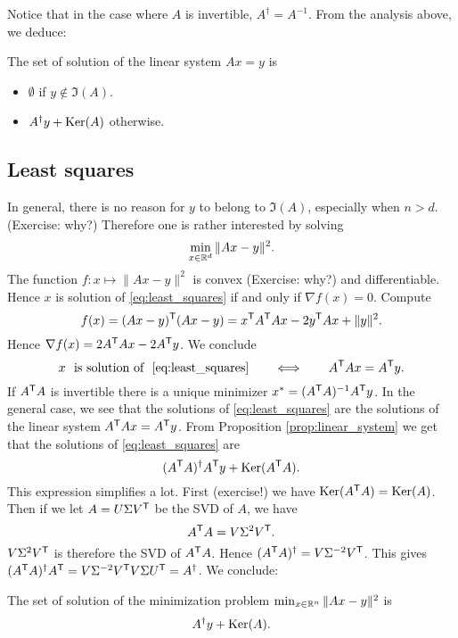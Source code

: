 \documentclass[11pt,nocut]{article}
\begin{document}
Notice that in the case where $A$ is invertible, $A^{\dagger} = A^{-1}$.
From the analysis above, we deduce:
\begin{proposition}\label{prop:linear_system}
	The set of solution of the linear system $Ax = y$ is
	\begin{itemize}
		\item $\emptyset$ if $y \not\in \Im(A)$.
		\item $A^{\dagger}y + {{\rm Ker}}(A)$ otherwise.
	\end{itemize}
\end{proposition}

\subsection{Least squares}

In general, there is no reason for $y$ to belong to $\Im(A)$, especially when $n > d$. (Exercise: why?)
Therefore one is rather interested by solving
\begin{equation}\label{eq:least_squares}
\min_{x \in \mathbb{R}^d} \| Ax - y \|^2.
\end{equation}
The function $f: x \mapsto \|Ax - y\|^2$ is convex (Exercise: why?) and differentiable. Hence
$x$ is solution of \eqref{eq:least_squares} if and only if $\nabla f (x) = 0$. Compute
$$
f(x) = (Ax - y)^{{\sf T}}(Ax - y) = x^{{\sf T}} A^{{\sf T}} A x - 2 y^{{\sf T}} A x + \|y\|^2.
$$
Hence $\nabla f(x) = 2 A^{{\sf T}} A x - 2 A^{{\sf T}} y$. We conclude
$$
x \ \ \text{is solution of} \ \ \eqref{eq:least_squares} \qquad
\Longleftrightarrow
\qquad A^{\sT} A x = A^{\sT} y.
$$
If $A^{{\sf T}} A$ is invertible there is a unique minimizer $x^* = (A^{{\sf T}} A)^{-1} A^{{\sf T}} y$.
In the general case, we see that the solutions of \eqref{eq:least_squares} are the solutions of the linear system $A^{{\sf T}} A x = A^{{\sf T}} y$. From Proposition \ref{prop:linear_system} we get that the solutions of \eqref{eq:least_squares} are
$$
(A^{{\sf T}}A)^{\dagger} A^{{\sf T}}y + {{\rm Ker}}(A^{{\sf T}} A).
$$
This expression simplifies a lot. First (exercise!) we have ${{\rm Ker}}(A^{{\sf T}} A) = {{\rm Ker}}(A)$.
Then if we let $A = U \Sigma V^{{\sf T}}$ be the SVD of $A$, we have
$$
A^{{\sf T}} A = V \Sigma^2 V^{{\sf T}}.
$$
$V \Sigma^2 V^{{\sf T}}$ is therefore the SVD of $A^{{\sf T}} A$. Hence $(A^{{\sf T}} A)^{\dagger} = V \Sigma^{-2} V^{{\sf T}}$.
This gives $(A^{{\sf T}}A)^{\dagger} A^{{\sf T}} = V \Sigma^{-2} V^{{\sf T}}V \Sigma U^{{\sf T}} = A^{\dagger}$. We conclude:

\begin{proposition}
	The set of solution of the minimization problem $\min_{x \in \mathbb{R}^n} \|Ax - y\|^2$ is
	$$
	A^{\dagger} y + {{\rm Ker}}(A).
	$$
\end{proposition}
\end{document}
